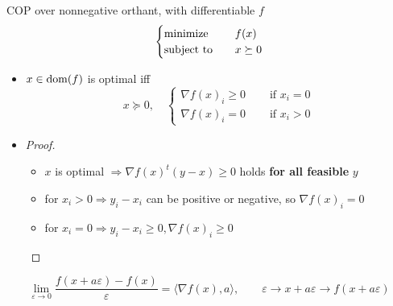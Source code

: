 \begin{remark}
    COP over nonnegative orthant, with differentiable $f$\[\begin{cases}
        \operatorname{minimize} \quad &f(x) \\
        \operatorname{subject\ to} \quad & x \succeq 0
    \end{cases}\]
    \begin{itemize}
        \item $x \in \operatorname{dom}(f)$ is optimal iff \[x \succeq 0,\quad \begin{cases}
            \nabla f(x)_i \ge 0 \quad &\text{ if } x_i = 0\\
            \nabla f(x)_{i} = 0 \quad &\text{ if } x_i > 0
        \end{cases}\]
        \item \begin{proof}
            \begin{itemize}
                \item $x$ is optimal $\Longrightarrow \nabla f(x)^t(y - x) \ge 0$ holds \textbf{for all feasible} $y$
                \item for $x_i > 0 \Longrightarrow y_i - x_i$ can be positive or negative, so $\nabla f(x)_i = 0$
                \item for $x_i = 0 \Longrightarrow y_i - x_i \ge 0, \nabla f(x)_i \ge 0$
            \end{itemize}
        \end{proof}
    \end{itemize}
\end{remark}

\begin{remark}
    \[\lim_{\varepsilon \to 0}\frac{f(x + a\varepsilon) - f(x)}{\varepsilon} = \langle\nabla f(x), a\rangle, \quad \quad \varepsilon \to x + a\varepsilon \to f(x + a\varepsilon)\]
\end{remark}


